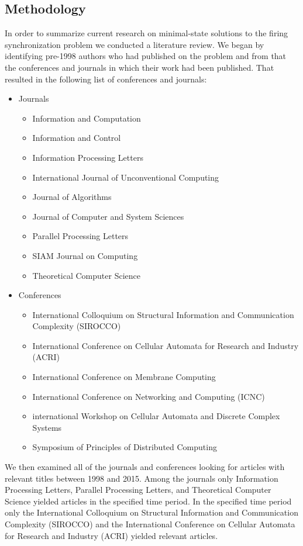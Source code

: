 \documentclass{article}
\begin{document}
\subsection{Methodology}
In order to summarize current research on minimal-state solutions to the firing synchronization problem we conducted a literature review. We began by identifying pre-1998 authors who had published on the problem and from that the conferences and journals in which their work had been published. That resulted in the following list of conferences and journals:
\begin{itemize}
\item Journals
	\begin{itemize}
		\item Information and Computation
		\item Information and Control
		\item Information Processing Letters
		\item International Journal of Unconventional Computing
		\item Journal of Algorithms
		\item Journal of Computer and System Sciences
		\item Parallel Processing Letters
		\item SIAM Journal on Computing
		\item Theoretical Computer Science
	\end{itemize}
\item Conferences
	\begin{itemize}
		\item International Colloquium on Structural Information and Communication Complexity (SIROCCO)
		\item International Conference on Cellular Automata for Research and Industry (ACRI)
		\item International Conference on Membrane Computing
		\item International Conference on Networking and Computing (ICNC)
		\item international Workshop on Cellular Automata and Discrete Complex Systems
		\item Symposium of Principles of Distributed Computing
	\end{itemize}
\end{itemize}
We then examined all of the journals and conferences looking for articles with relevant titles between 1998 and 2015. Among the journals only Information Processing Letters, Parallel Processing Letters, and Theoretical Computer Science yielded articles in the specified time period. In the specified time period only the International Colloquium on Structural Information and Communication Complexity (SIROCCO) and the International Conference on Cellular Automata for Research and Industry (ACRI) yielded relevant articles.
\end{document}

